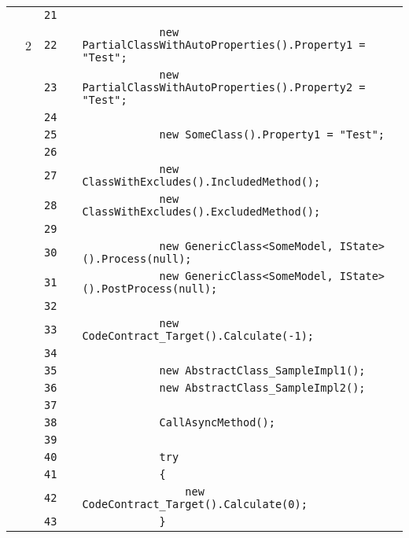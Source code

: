 \documentclass[a4paper,landscape,10pt]{article}
\begin{document}
\begin{longtable}[l]{lrrll}
\cellcolor{gray} &  & \verb~21~ & & \verb~~\\
\cellcolor{green} & 2 & \verb~22~ & & \verb~            new PartialClassWithAutoProperties().Property1 = "Test";~\\
\cellcolor{gray} &  & \verb~23~ & & \verb~            new PartialClassWithAutoProperties().Property2 = "Test";~\\
\cellcolor{gray} &  & \verb~24~ & & \verb~~\\
\cellcolor{gray} &  & \verb~25~ & & \verb~            new SomeClass().Property1 = "Test";~\\
\cellcolor{gray} &  & \verb~26~ & & \verb~~\\
\cellcolor{gray} &  & \verb~27~ & & \verb~            new ClassWithExcludes().IncludedMethod();~\\
\cellcolor{gray} &  & \verb~28~ & & \verb~            new ClassWithExcludes().ExcludedMethod();~\\
\cellcolor{gray} &  & \verb~29~ & & \verb~~\\
\cellcolor{gray} &  & \verb~30~ & & \verb~            new GenericClass<SomeModel, IState>().Process(null);~\\
\cellcolor{gray} &  & \verb~31~ & & \verb~            new GenericClass<SomeModel, IState>().PostProcess(null);~\\
\cellcolor{gray} &  & \verb~32~ & & \verb~~\\
\cellcolor{gray} &  & \verb~33~ & & \verb~            new CodeContract_Target().Calculate(-1);~\\
\cellcolor{gray} &  & \verb~34~ & & \verb~~\\
\cellcolor{gray} &  & \verb~35~ & & \verb~            new AbstractClass_SampleImpl1();~\\
\cellcolor{gray} &  & \verb~36~ & & \verb~            new AbstractClass_SampleImpl2();~\\
\cellcolor{gray} &  & \verb~37~ & & \verb~~\\
\cellcolor{gray} &  & \verb~38~ & & \verb~            CallAsyncMethod();~\\
\cellcolor{gray} &  & \verb~39~ & & \verb~~\\
\cellcolor{gray} &  & \verb~40~ & & \verb~            try~\\
\cellcolor{gray} &  & \verb~41~ & & \verb~            {~\\
\cellcolor{gray} &  & \verb~42~ & & \verb~                new CodeContract_Target().Calculate(0);~\\
\cellcolor{gray} &  & \verb~43~ & & \verb~            }~\\

\end{longtable}
\end{document}
